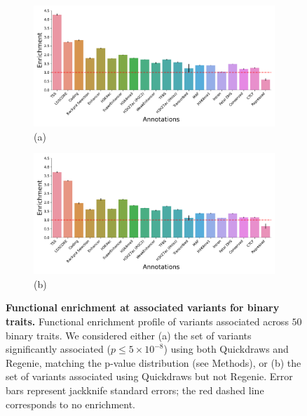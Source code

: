 \begin{figure}[h!]
    \centering
    \begin{subfigure}{0.5\textwidth}
    \captionsetup{justification=raggedright,singlelinecheck=false}
    \caption*{\large{(a)}}
    \includegraphics[width=\textwidth]{figures/functional/annotation_both_binary.pdf}
    \end{subfigure}%
    \begin{subfigure}{0.5\textwidth}
    \captionsetup{justification=raggedright,singlelinecheck=false}
    \caption*{\large{(b)}}
    \includegraphics[width=\textwidth]{figures/functional/annotation_onlyqd_binary.pdf}
    \end{subfigure}
    \caption{\textbf{Functional enrichment at associated variants for binary traits.}
    Functional enrichment profile of variants associated across $50$ binary traits.
    We considered either (a) the set of variants significantly associated ($p \leq 5 \times 10^{-8}$) using both Quickdraws and Regenie, matching the p-value distribution (see Methods), or (b) the set of variants associated using Quickdraws but not Regenie.
    Error bars represent jackknife standard errors; the red dashed line corresponds to no enrichment.
    }
    \label{fig:functional_bt}
\end{figure}

